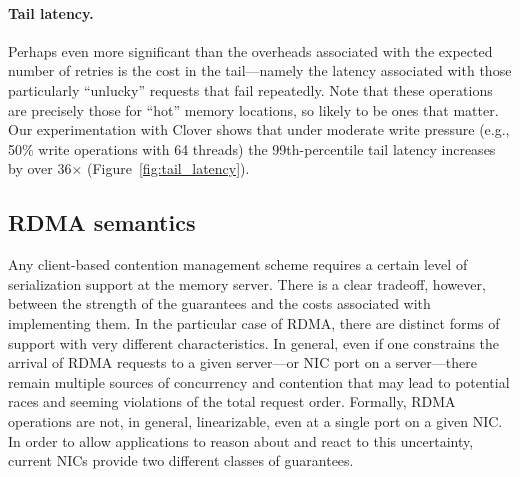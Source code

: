 \paragraph{Tail latency.}

Perhaps even more significant than the overheads associated with the
expected number of retries is the cost in the tail---namely the
latency associated with those particularly ``unlucky'' requests that
fail repeatedly.  Note that these operations are precisely those for
``hot'' memory locations, so likely to be ones that matter.  Our
experimentation with Clover shows that under moderate write pressure
(e.g., 50\% write operations with 64 threads) the 99th-percentile tail
latency increases by over 36$\times$ (Figure~\ref{fig:tail_latency}).



\subsection{RDMA semantics}

Any client-based contention management scheme requires a certain level
of serialization support at the memory server.  There is a clear
tradeoff, however, between the strength of the guarantees and the
costs associated with implementing them.  In the particular case of
RDMA, there are distinct forms of support with very different
characteristics.  In general, even if one constrains the arrival of
RDMA requests to a given server---or NIC port on a server---there
remain multiple sources of concurrency and contention that may lead to
potential races and seeming violations of the total request order.
Formally, RDMA operations are not, in general, linearizable, even at a
single port on a given NIC.  In order to allow applications to reason
about and react to this uncertainty, current NICs provide two
different classes of guarantees.

